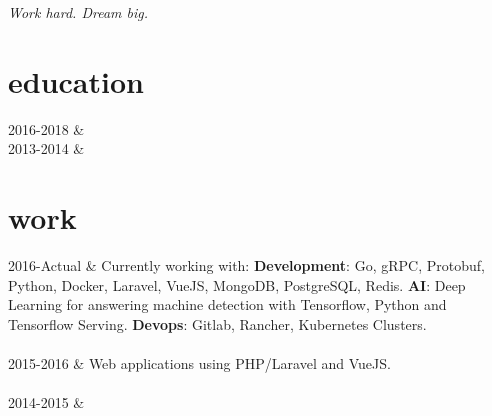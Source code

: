 \documentclass[]{cv-mauri}
\begin{document}

\textit{Work hard. Dream big.}

\section*{education}
\begin{tabularcv}
    2016-2018   &   
                    \\[\vspacepar] %
    2013-2014   &   
\end{tabularcv}

\section*{work}
\begin{tabularcv}
    2016-Actual   &   
                    \newline 
                    Currently working with: \newline
                    \textbf{Development}: Go, gRPC, Protobuf, Python, Docker, Laravel, VueJS, MongoDB, PostgreSQL, Redis.
                    \newline
                    \textbf{AI}: Deep Learning for answering machine detection with Tensorflow, Python and Tensorflow Serving. \newline
                    \textbf{Devops}: Gitlab, Rancher, Kubernetes Clusters.
                    \\[\vspacepar]
                    \\[\vspacepar]
    2015-2016   &   
                    \newline Web applications using PHP/Laravel and VueJS.
                    \\[\vspacepar]
                    \\[\vspacepar]
	2014-2015   &   
\end{tabularcv}
\end{document}
